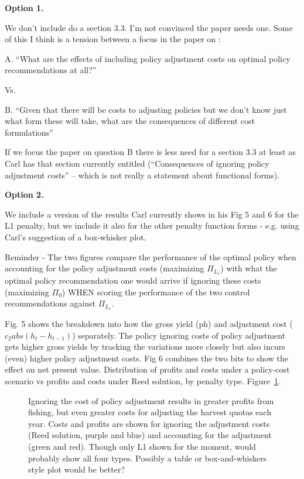 \documentclass[authoryear, review, 12pt]{elsarticle}
\begin{document}
{\color{blue}
   
  \textbf{Option 1.}

  We don’t include do a section 3.3. I’m not convinced the paper needs one. Some of this I think is a tension between a focus in the paper on :

  A.      ``What are the effects of including policy adjustment costs on optimal policy recommendations at all?''

  Vs.

B.      ``Given that there will be costs to adjusting policies but we don’t know just what form these will take, what are the consequences of different cost formulations''



If we focus the paper on question B there is less need for a section 3.3 at least as Carl has that section currently entitled (``Consequences of ignoring policy adjustment costs'' – which is not really a statement about functional forms).
   

\textbf{Option 2.}

  We include a version of the results Carl currently shows in his Fig 5 and 6 for the L1 penalty, but we include it also for the other penalty function forms - e.g. using Carl’s suggestion of a box-whisker plot.
   
Reminder - The two figures compare the performance of the optimal policy when accounting for the policy adjustment costs (maximizing $\Pi_{L_1}$) with what the optimal policy recommendation one would arrive if ignoring these costs (maximizing $\Pi_0$) WHEN scoring the performance of the two control recommendations against $\Pi_{L_1}$.

Fig. 5 shows the breakdown into how the gross yield (ph) and adjustment cost ($c_2 abs(h_t-h_{t-1})$) separately. The policy ignoring costs of policy adjustment gets higher gross yields by tracking the variations more closely but also incurs (even) higher policy adjustment costs. Fig 6 combines the two bits to show the effect on net present value. Distribution of profits and costs under a policy-cost scenario vs profits and costs under Reed solution, by penalty type. Figure~\ref{fig:profits_costs}.
}

\begin{figure}
  \begin{center}
    \caption{Ignoring the cost of policy adjustment results in greater profits from fishing, but even greater costs for adjusting the harvest quotas each year.  Costs and profits are shown for ignoring the adjustment costs (Reed solution, purple and blue) and accounting for the adjustment (green and red).  {\color{green}Though only L1 shown for the moment, would probably show all four types.  Possibly a table or box-and-whiskers style plot would be better?}}\label{fig:profits_costs}
  \end{center}
\end{figure}
\end{document}
